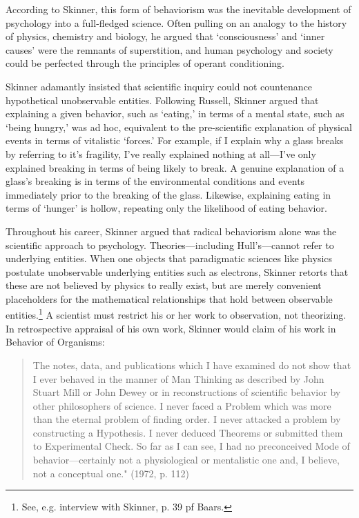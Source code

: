 \begin{refsection}
According to Skinner, this form of behaviorism was the inevitable development of psychology into a full-fledged science. Often pulling on an analogy to the history of physics, chemistry and biology, he argued that `consciousness' and `inner causes' were the remnants of superstition, and human psychology and society could be perfected through the principles of operant conditioning. 

Skinner adamantly insisted that scientific inquiry could not countenance hypothetical unobservable entities. Following Russell, Skinner argued that explaining a given behavior, such as `eating,' in terms of a mental state, such as `being hungry,' was ad hoc, equivalent to the pre-scientific explanation of physical events in terms of vitalistic `forces.' For example, if I explain why a glass breaks by referring to it's fragility, I've really explained nothing at all---I've only explained breaking in terms of being likely to break. A genuine explanation of a glass's breaking is in terms of the environmental conditions and events immediately prior to the breaking of the glass. Likewise, explaining eating in terms of `hunger' is hollow, repeating only the likelihood of eating behavior.

Throughout his career, Skinner argued that radical behaviorism alone was the scientific approach to psychology. Theories---including Hull's---cannot refer to underlying entities. When one objects that paradigmatic sciences like physics postulate unobservable underlying entities such as electrons, Skinner retorts that these are not believed by physics to really exist, but are merely convenient placeholders for the mathematical relationships that hold between observable entities.\footnote{See, e.g. interview with Skinner, p. 39 pf Baars.} A scientist must restrict his or her work to observation, not theorizing. In retrospective appraisal of his own work, Skinner would claim of his work in Behavior of Organisms:

\begin{quote}

The notes, data, and publications which I have examined do not show that I ever behaved in the manner of Man Thinking as described by John Stuart Mill or John Dewey or in reconstructions of scientific behavior by other philosophers of science. I never faced a Problem which was more than the eternal problem of finding order. I never attacked a problem by constructing a Hypothesis. I never deduced Theorems or submitted them to Experimental Check. So far as I can see, I had no preconceived Mode of behavior---certainly not a physiological or mentalistic one and, I believe, not a conceptual one." (1972, p. 112)
\end{quote}


\end{refsection}
